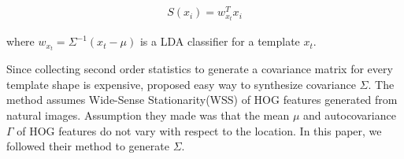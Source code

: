 \begin{align}
    S(x_i) = w_{x_t}^T x_i
\end{align}

where $w_{x_t} = \Sigma^{-1} (x_t - \mu)$ is a LDA classifier for a template $x_t$.



% 
% 



Since collecting second order statistics to generate a covariance matrix for
every template shape is expensive, \cite{Hariharan12} proposed easy way to
synthesize covariance $\Sigma$. The method \cite{Hariharan12} assumes
Wide-Sense Stationarity(WSS) of HOG features generated from natural images.
Assumption they made was that the mean $\mu$ and autocovariance $\Gamma$ of HOG
features do not vary with respect to the location. In this paper, we followed
their method to generate $\Sigma$.


